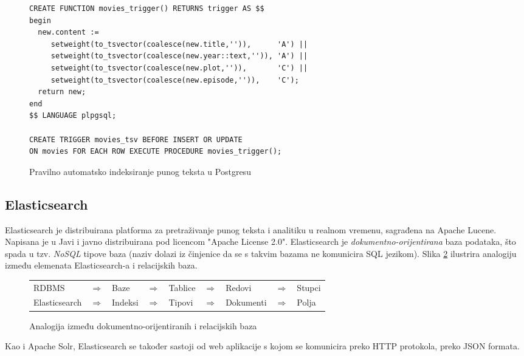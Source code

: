 \documentclass[a4paper,twoside,12pt]{scrreprt}
\begin{document}
\begin{figure}[H]
  \begin{Verbatim}[frame=single]
CREATE FUNCTION movies_trigger() RETURNS trigger AS $$
begin
  new.content :=
     setweight(to_tsvector(coalesce(new.title,'')),      'A') ||
     setweight(to_tsvector(coalesce(new.year::text,'')), 'A') ||
     setweight(to_tsvector(coalesce(new.plot,'')),       'C') ||
     setweight(to_tsvector(coalesce(new.episode,'')),    'C');
  return new;
end
$$ LANGUAGE plpgsql;

CREATE TRIGGER movies_tsv BEFORE INSERT OR UPDATE
ON movies FOR EACH ROW EXECUTE PROCEDURE movies_trigger();
  \end{Verbatim}
  \caption{Pravilno automatsko indeksiranje punog teksta u Postgresu}
  \label{postgres-indexing}
\end{figure}

\subsection{Elasticsearch}

Elasticsearch je distribuirana platforma za pretraživanje punog teksta i analitiku u realnom vremenu, sagrađena na Apache Lucene. Napisana je u Javi i javno distribuirana pod licencom "Apache License 2.0". Elasticsearch je \textit{dokumentno-orijentirana} baza podataka, što spada u tzv. \textit{NoSQL} tipove baza (naziv dolazi iz činjenice da se s takvim bazama ne komunicira SQL jezikom). Slika \ref{elasticsearch} ilustrira analogiju između elemenata Elasticsearch-a i relacijskih baza.

\begin{figure}[H]
  \centering
  \begin{tabular}{lllllllll}
    RDBMS         & $\Rightarrow$ & Baze    & $\Rightarrow$ & Tablice & $\Rightarrow$ & Redovi    & $\Rightarrow$ & Stupci \\
    Elasticsearch & $\Rightarrow$ & Indeksi & $\Rightarrow$ & Tipovi  & $\Rightarrow$ & Dokumenti & $\Rightarrow$ & Polja  \\
  \end{tabular}
  \caption{Analogija između dokumentno-orijentiranih i relacijskih baza}
  \label{elasticsearch}
\end{figure}

Kao i Apache Solr, Elasticsearch se također sastoji od web aplikacije s kojom se komunicira preko HTTP protokola, preko JSON formata.
\end{document}
